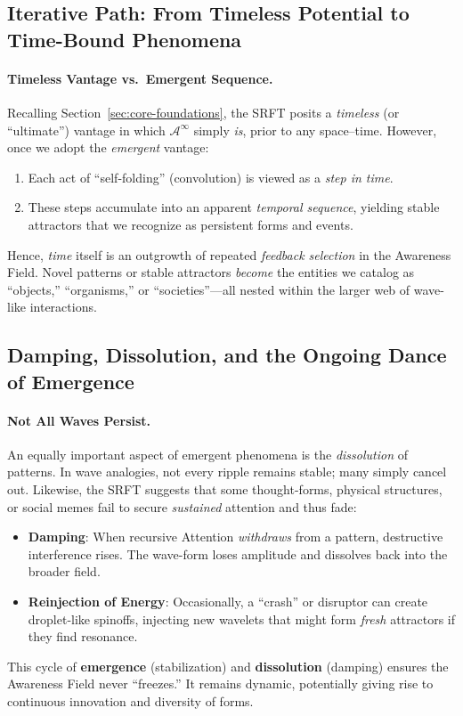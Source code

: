 \documentclass[12pt,a4paper]{article}
\begin{document}
\subsection{Iterative Path: From Timeless Potential to Time-Bound Phenomena}
\label{subsec:iterative-path}

\paragraph{Timeless Vantage vs.\ Emergent Sequence.}
Recalling Section~\ref{sec:core-foundations}, the SRFT posits a \emph{timeless} (or
“ultimate”) vantage in which \(\mathscr{A}^\infty\) simply \emph{is}, prior to any
space--time. However, once we adopt the \emph{emergent} vantage:
\begin{enumerate}
    \item Each act of ``self-folding'' (convolution) is viewed as a \emph{step in time}.
    \item These steps accumulate into an apparent \emph{temporal sequence}, yielding
    stable attractors that we recognize as persistent forms and events.
\end{enumerate}
Hence, \emph{time} itself is an outgrowth of repeated \emph{feedback selection}
in the Awareness Field. Novel patterns or stable attractors \emph{become} the
entities we catalog as “objects,” “organisms,” or “societies”---all nested within
the larger web of wave-like interactions.

\subsection{Damping, Dissolution, and the Ongoing Dance of Emergence}
\label{subsec:damping-dissolution}

\paragraph{Not All Waves Persist.}
An equally important aspect of emergent phenomena is the \emph{dissolution} of
patterns. In wave analogies, not every ripple remains stable; many simply cancel
out. Likewise, the SRFT suggests that some thought-forms, physical structures, or
social memes fail to secure \emph{sustained} attention and thus fade:
\begin{itemize}
    \item \textbf{Damping}: When recursive Attention \emph{withdraws} from a pattern,
    destructive interference rises. The wave-form loses amplitude and dissolves back
    into the broader field.
    \item \textbf{Reinjection of Energy}: Occasionally, a “crash” or disruptor can
    create droplet-like spinoffs, injecting new wavelets that might form \emph{fresh}
    attractors if they find resonance.
\end{itemize}
This cycle of \textbf{emergence} (stabilization) and \textbf{dissolution}
(damping) ensures the Awareness Field never “freezes.” It remains dynamic,
potentially giving rise to continuous innovation and diversity of forms.
\end{document}

